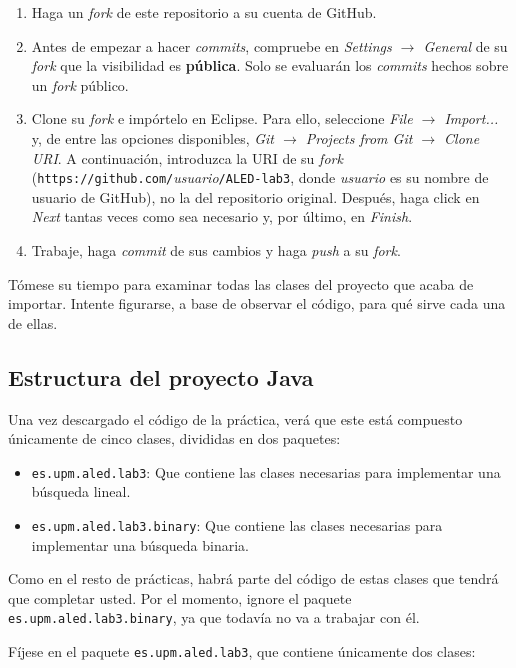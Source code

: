 \documentclass[10pt,a4paper,spanish]{article}
\newcommand{\code}[1]{\texttt{#1}}
\begin{document}
\begin{enumerate}
    \item Haga un \textit{fork} de este repositorio a su cuenta de GitHub.
    \item Antes de empezar a hacer \textit{commits}, compruebe en \textit{Settings $\to$ General} de su \textit{fork} que la visibilidad es \textbf{pública}. Solo se evaluarán los \textit{commits} hechos sobre un \textit{fork} público.
    \item Clone su \textit{fork} e impórtelo en Eclipse. Para ello, seleccione \textit{File $\to$ Import...} y, de entre las opciones disponibles, \textit{Git $\to$ Projects from Git $\to$ Clone URI}. A continuación, introduzca la URI de su \textit{fork} (\texttt{https://github.com/}\textit{usuario}\texttt{/ALED-lab3}, donde \textit{usuario} es su nombre de usuario de GitHub), no la del repositorio original. Después, haga click en \textit{Next} tantas veces como sea necesario y, por último, en \textit{Finish}.
    \item Trabaje, haga \textit{commit} de sus cambios y haga \textit{push} a su \textit{fork}.
\end{enumerate}

Tómese su tiempo para examinar todas las clases del proyecto que acaba de importar. Intente figurarse, a base de observar el código, para qué sirve cada una de ellas.

\subsection{Estructura del proyecto Java}

Una vez descargado el código de la práctica, verá que este está compuesto únicamente de cinco clases, divididas en dos paquetes:

\begin{itemize}
    \item \code{es.upm.aled.lab3}: Que contiene las clases necesarias para implementar una búsqueda lineal.
    \item \code{es.upm.aled.lab3.binary}: Que contiene las clases necesarias para implementar una búsqueda binaria.
\end{itemize}

Como en el resto de prácticas, habrá parte del código de estas clases que tendrá que completar usted. Por el momento, ignore el paquete \code{es.upm.aled.lab3.binary}, ya que todavía no va a trabajar con él. 

Fíjese en el paquete \code{es.upm.aled.lab3}, que contiene únicamente dos clases:
\end{document}
